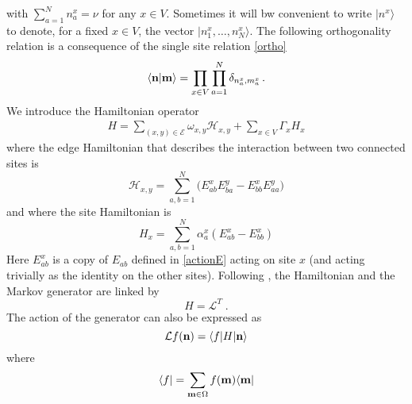 \documentclass[10pt]{article}
\numberwithin{equation}{section}
\numberwithin{equation}{subsection}
\newcommand{\dt}{\;.}
\begin{document}
with $\sum_{a=1}^{N}n_{a}^{x}=\nu$ for any $x\in V$. Sometimes it will bw convenient to write $|n^{x}\rangle$ to denote, for a fixed $x\in V$, the vector $|n_{1}^{x},\ldots,n_{N}^{x}\rangle$.
The following orthogonality relation is a consequence of the single site relation \eqref{ortho}
\begin{equation}
    \langle {\bf n}|{\bf m}\rangle =\prod_{x\in V}\prod_{a=1}^N\delta_{n^x_a,m^{x}_a}\,.
\end{equation}
We introduce the Hamiltonian operator
\begin{equation}\label{OriginalHamiltonian}
	\begin{split}
		H=\sum_{(x,y)\in \mathcal{E}}\omega_{x,y}\mathcal{H}_{x,y}+\sum_{x\in V}\Gamma_{x}H_{x}
	\end{split}
\end{equation}
where the edge Hamiltonian that describes the interaction between two connected sites is
\begin{equation}\label{edgeHamiltonian}
\mathcal{H}_{x,y}=\sum_{a,b=1}^{N}\Big(E_{ab}^{x} E_{b a}^{y}-E_{bb}^{x} E_{aa}^{y}\Big)
 \end{equation}
  and where the site Hamiltonian is
 \begin{equation}\label{siteHamiltonian}
H_{x}=\sum_{a,b=1}^{N}\alpha_{a}^{x}\left(E_{ab}^{x}-E_{bb}^{x}\right)
\end{equation}
Here $E_{ab}^{x}$ is a copy of $E_{ab}$ defined in \eqref{actionE} acting on site $x$ (and
acting trivially as the identity on the other sites). 
Following  \cite{belitsky2015self}, the Hamiltonian and the Markov generator are linked by
\begin{equation}\label{Hamiltonian-Generator}
H=\mathcal{L}^{T}\dt
\end{equation}
The action of the generator can also be expressed as 
\begin{equation}
    \mathcal{L}f( {\bf n})=\langle f|H| {\bf n}\rangle
\end{equation}
where 
\begin{equation}
    \langle f|=\sum_{ {{\bf m}\in \Omega}}f( {\bf m})\langle  {\bf m}|
\end{equation}
\end{document}

